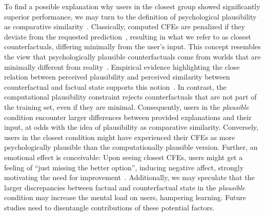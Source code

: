To find a possible explanation why users in the closest group showed significantly superior performance, we may turn to the definition of psychological plausibility as comparative similarity~\citep{lewis_counterfactuals_1973, stanley_counterfactual_2017}. 
Classically, computed CFEs are penalized if they deviate from the requested prediction~\citep{wachter_counterfactual_2017}, resulting in what we refer to as closest counterfactuals, differing minimally from the user's input.
This concept resembles the view that psychologically plausible counterfactuals come from worlds that are minimally different from reality~\citep{lewis_counterfactuals_1973}.
Empirical evidence highlighting the close relation between perceived plausibility and perceived similarity between counterfactual and factual state supports this notion~\citep{stanley_counterfactual_2017, de_brigard_perceived_2021}.
In contrast, the computational plausibility constraint rejects counterfactuals that are not part of the training set, even if they are minimal.
Consequently, users in the \textit{plausible} condition encounter larger differences between provided explanations and their input, at odds with the idea of plausibility as comparative similarity.
Conversely, users in the closest condition might have experienced their \glspl{CFE} as more psychologically plausible than the computationally plausible version.
Further, an emotional effect is conceivable: Upon seeing closest \glspl{CFE}, users might get a feeling of ``just missing the better option'', inducing negative affect, strongly motivating the need for improvement~\citep{medvec_when_1997, markman_reflection_2003}.
Additionally, we may speculate that the larger discrepancies between factual and counterfactual state in the \textit{plausible} condition may increase the mental load on users, hampering learning.
Future studies need to disentangle contributions of these potential factors.

